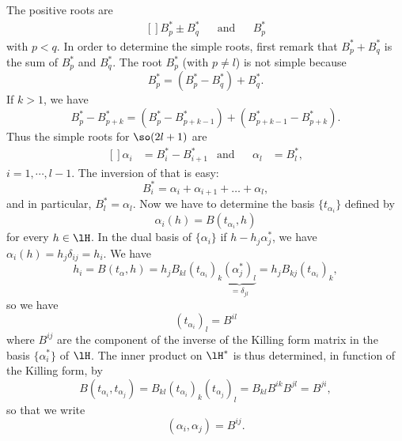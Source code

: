 The positive roots are
\begin{equation}
	\begin{aligned}[]
		B_p^*\pm B_q^*	&&	\text{and}	&& B_p^*
	\end{aligned}
\end{equation}
with $p<q$. In order to determine the simple roots, first remark that $B_p^*+B_q^*$ is the sum of $B_p^*$ and $B_q^*$. The root $B_p^*$ (with $p\neq l$) is not simple because
\begin{equation}
	B^*_p=(B^*_p-B^*_q)+B^*_q.
\end{equation}
If $k>1$, we have
\begin{equation}
	B_p^*-B^*_{p+k} = (B_p^*-B^*_{p+k-1} )+(B_{p+k-1}^*-B^*_{p+k} ).
\end{equation}
Thus the simple roots for $\so(2l+1)$ are
\begin{equation}			\label{EqRacinesSimplessol}
	\begin{aligned}[]
		\alpha_i &=B^*_i-B^*_{i+1}	&	\text{and}	&&	\alpha_l &=B^*_l,
	\end{aligned}
\end{equation}
$i=1,\cdots,l-1$. The inversion of that is easy: 
\begin{equation}		\label{EqsonBenFnDesAlpha}
	B^*_i=\alpha_i+\alpha_{i+1}+\ldots+\alpha_l,
\end{equation}
and in particular, $B^*_l=\alpha_l$. Now we have to determine the basis $\{ t_{\alpha_i}\}$ defined by
\begin{equation}
	\alpha_i(h)=B(t_{\alpha_i},h)
\end{equation}
for every $h\in\lH$. In the dual basis of $\{\alpha_i\}$ if $h-h_j\alpha_j^*$, we have $\alpha_i(h)=h_j\delta_{ij}=h_i$. We have
\begin{equation}
	h_i=B(t_{\alpha},h)=h_jB_{kl}(t_{\alpha_i})_k\underbrace{(\alpha_j^*)_l}_{=\delta_{jl}}=h_jB_{kj}(t_{\alpha_i})_k,
\end{equation}
so we have
\begin{equation}
	(t_{\alpha_i})_l=B^{il}
\end{equation}
where $B^{ij}$ are the component of the inverse of the Killing form matrix in the basis $\{ \alpha_i^* \}$ of $\lH$. The inner product on $\lH^*$ is thus determined, in function of the Killing form, by
\begin{equation}
	B(t_{\alpha_i},t_{\alpha_j})=B_{kl}(t_{\alpha_i})_k(t_{\alpha_j})_l=B_{kl}B^{ik}B^{jl}=B^{ji},
\end{equation}
so that we write
\begin{equation}
	(\alpha_i,\alpha_j)=B^{ij}.
\end{equation}

